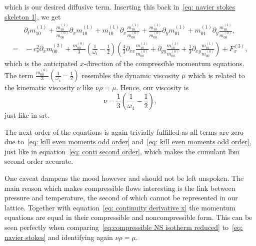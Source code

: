 which is our desired diffusive term.
Inserting this back in~\eqref{eq: navier stokes skeleton 1}, we get
\begin{align}
  \nonumber
& \partial_t m_{10}^{(1)}
+\frac{ m_{10}^{{(1)}} }{m_{00}^{(0)}} \partial_x  m_{10}^{{(1)}}
+  m_{10}^{{(1)}} \partial_x \frac{ m_{10}^{{(1)}} }{m_{00}^{(0)}}
+ \frac{ m_{10}^{(1)}}{m_{00}^{(0)}}\partial_y m_{01}^{(1)}
+ m_{01}^{(1)}\partial_y \frac{ m_{10}^{(1)}}{m_{00}^{(0)}},
\\=&\,
- c_s^2 \partial_x  m_{00}^{(2)}
+ \frac{m_{00}^{(0)}}{3}\left(
    \frac{1}{\omega_4}
    - \frac{1}{2}
  \right) \left(\frac{4}{3}\partial_{xx} \frac{m_{10}^{(1)}}{m_{00}^{(0)}}
  + \partial_{yy} \frac{m_{10}^{(1)}}{m_{00}^{(0)}} + \frac{1}{3}\partial_{xy} \frac{m_{01}^{(1)}}{m_{00}^{(0)}}\right)
+ F_x^{(3)},
\label{eq: navier stokes derived}
\end{align}
which is the anticipated $x$-direction of the compressible momentum equations.
The term $\frac{m_{00}^{(0)}}{3}\left(\frac{1}{\omega_4} - \frac{1}{2}\right)$ resembles the dynamic viscosity $\mu$ which is related to the kinematic viscosity $\nu$ like $\nu\rho=\mu$.
Hence, our viscosity is
\begin{equation}
  \nu = \frac{1}{3}\left(
      \frac{1}{\omega_4}
      - \frac{1}{2}
    \right),
\end{equation}
just like in \gls{srt}.

The next order of the equations is again trivially fulfilled as all terms are zero due to~\eqref{eq: kill even moments odd order} and~\eqref{eq: kill even moments odd order}, just like in equation~\eqref{eq: conti second order}, which makes the cumulant \gls{lbm} second order accurate.

One caveat dampens the mood however and should not be left unspoken.
The main reason which makes compressible flows interesting is the link between pressure and temperature, the second of which cannot be represented in our lattice.
Together with equation~\eqref{eq: continuity derivative x} the momentum equations are equal in their compressible and noncompressible form.
This can be seen perfectly when comparing~\eqref{eq:compressible NS isotherm reduced} to~\eqref{eq: navier stokes} and identifying again $\nu \rho = \mu$.
